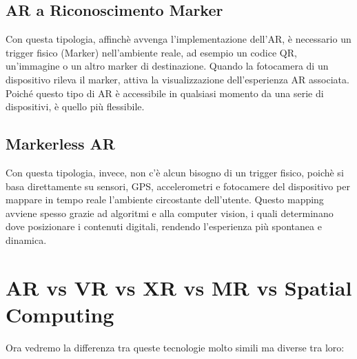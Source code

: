 \subsection{AR a Riconoscimento Marker}
Con questa tipologia, affinchè avvenga l'implementazione dell'AR, è necessario un trigger fisico (Marker) nell'ambiente reale, ad esempio un codice QR, un'immagine o un altro marker di destinazione. Quando la fotocamera di un dispositivo rileva il marker, attiva la visualizzazione dell'esperienza AR associata. Poiché questo tipo di AR è accessibile in qualsiasi momento da una serie di dispositivi, è quello più flessibile.
\subsection{Markerless AR}
Con questa tipologia, invece, non c'è alcun bisogno di un trigger fisico, poichè si basa direttamente su sensori, GPS, accelerometri e fotocamere del dispositivo per mappare in tempo reale l'ambiente circostante dell'utente. Questo mapping avviene spesso grazie ad algoritmi e alla computer vision, i quali determinano dove posizionare i contenuti digitali, rendendo l'esperienza più spontanea e dinamica.
 
\section{AR vs VR vs XR vs MR vs Spatial Computing}
Ora vedremo la differenza tra queste tecnologie molto simili ma diverse tra loro\cite{ar-vs-other}\cite{The-virtuality-continuum}:

